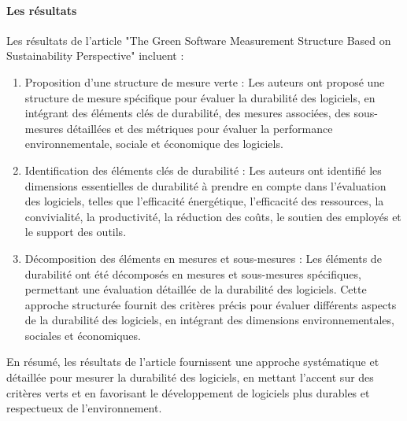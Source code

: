 \paragraph{Les résultats}
Les résultats de l'article "The Green Software Measurement Structure Based on Sustainability Perspective" incluent :
\begin{enumerate}
    \item Proposition d'une structure de mesure verte : Les auteurs ont proposé une structure de mesure spécifique pour évaluer la durabilité des logiciels, en intégrant des éléments clés de durabilité, des mesures associées, des sous-mesures détaillées et des métriques pour évaluer la performance environnementale, sociale et économique des logiciels.
    \item Identification des éléments clés de durabilité : Les auteurs ont identifié les dimensions essentielles de durabilité à prendre en compte dans l'évaluation des logiciels, telles que l'efficacité énergétique, l'efficacité des ressources, la convivialité, la productivité, la réduction des coûts, le soutien des employés et le support des outils.
    \item Décomposition des éléments en mesures et sous-mesures : Les éléments de durabilité ont été décomposés en mesures et sous-mesures spécifiques, permettant une évaluation détaillée de la durabilité des logiciels. Cette approche structurée fournit des critères précis pour évaluer différents aspects de la durabilité des logiciels, en intégrant des dimensions environnementales, sociales et économiques.
\end{enumerate}
En résumé, les résultats de l'article fournissent une approche systématique et détaillée pour mesurer la durabilité des logiciels, en mettant l'accent sur des critères verts et en favorisant le développement de logiciels plus durables et respectueux de l'environnement.